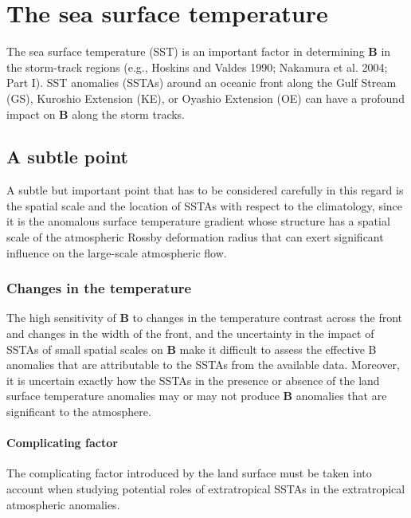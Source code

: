 \documentclass{ametsocv6.1}
\begin{document}
\section{The sea surface temperature}
The sea surface temperature
 (SST) is an important factor
in determining $\mathbf{B}$ in the storm-track regions (e.g.,
Hoskins and Valdes 1990; Nakamura et al. 2004; Part I).
SST anomalies (SSTAs) around an oceanic front along the
Gulf Stream (GS), Kuroshio Extension (KE), or Oyashio
Extension (OE) can have a profound impact on $\mathbf{B}$ along
the storm tracks. 

\subsection{A subtle point}
A subtle but important point that has to
be considered carefully in this regard is the spatial scale
and the location of SSTAs with respect to the climatology,
since it is the anomalous surface temperature
gradient whose structure has a spatial scale of the atmospheric
Rossby deformation radius that can exert significant
influence on the large-scale atmospheric flow. 

\subsubsection{Changes in the temperature}
The
high sensitivity of $\mathbf{B}$ to changes in the temperature contrast
across the front and changes in the width of the front, and
the uncertainty in the impact of SSTAs of small spatial
scales on $\mathbf{B}$ make it difficult to assess the effective B
anomalies that are attributable to the SSTAs from the
available data. Moreover, it is uncertain exactly how the
SSTAs in the presence or absence of the land surface
temperature anomalies may or may not produce $\mathbf{B}$ anomalies
that are significant to the atmosphere. 

\paragraph{Complicating factor}The complicating
factor introduced by the land surface must be taken
into account when studying potential roles of extratropical
SSTAs in the extratropical atmospheric anomalies.
\end{document}
